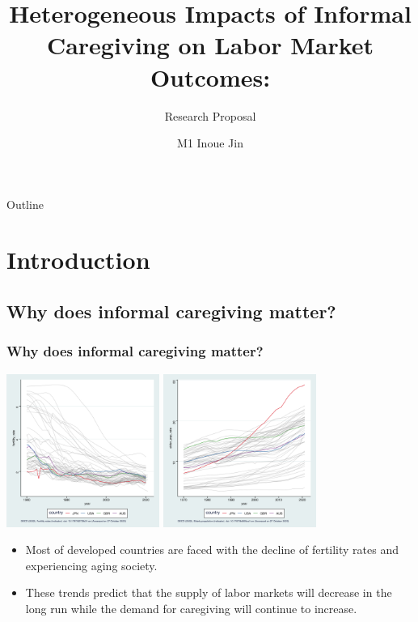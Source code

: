 \documentclass{beamer}
\title{Heterogeneous Impacts of Informal Caregiving on Labor Market Outcomes:}
\subtitle{Research Proposal}
\author{M1 Inoue Jin}
\institute{Hitotsubashi University}
\begin{document}
\begin{frame}
    \titlepage
\end{frame}

\begin{frame}{Outline}
    \tableofcontents
\end{frame}

\section{Introduction}

    \subsection{Why does informal caregiving matter?}
        \begin{frame}\frametitle{Why does informal caregiving matter?}
            \includegraphics[height = 5cm]{OECD_fertility_rates.png}
            \includegraphics[height = 5cm]{OECD_Elderly_pop_rate.png}
            \begin{itemize}
                \item Most of developed countries are faced with the decline of fertility rates and experiencing aging society.
                \item These trends predict that the supply of labor markets will decrease in the long run while the demand for caregiving will continue to increase. 
            \end{itemize}
        \end{frame}
\end{document}
